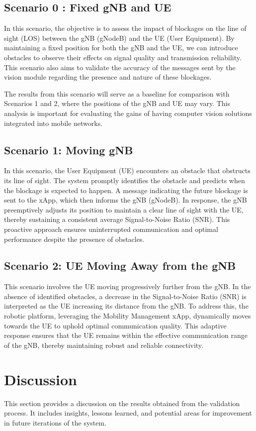\subsection{Scenario 0 : Fixed gNB and UE}

In this scenario, the objective is to assess the impact of blockages on the line of sight (LOS) between the gNB (gNodeB) and the UE (User Equipment).
By maintaining a fixed position for both the gNB and the UE, we can introduce obstacles to observe their effects on signal quality and transmission reliability.
This scenario also aims to validate the accuracy of the messages sent by the vision module regarding the presence and nature of these blockages.

The results from this scenario will serve as a baseline for comparison with Scenarios 1 and 2, where the positions of the gNB and UE may vary.
This analysis is important for evaluating the gains of having computer vision solutions integrated into mobile networks.

\subsection{Scenario 1: Moving gNB}
In this scenario, the User Equipment (UE) encounters an obstacle that obstructs its line of sight. %
The system promptly identifies the obstacle and predicts when the blockage is expected to happen.
A message indicating the future blockage is sent to the xApp, which then informs the gNB (gNodeB). In response, the gNB preemptively adjusts its position to maintain a clear line of sight with the UE, thereby sustaining a consistent average Signal-to-Noise Ratio (SNR). This proactive approach ensures uninterrupted communication and optimal performance despite the presence of obstacles.

\subsection{Scenario 2: UE Moving Away from the gNB}

This scenario involves the UE moving progressively further from the gNB. In the absence of identified obstacles, a decrease in the Signal-to-Noise Ratio (SNR) is interpreted as the UE increasing its distance from the gNB. To address this, the robotic platform, leveraging the Mobility Management xApp, dynamically moves towards the UE to uphold optimal communication quality.
This adaptive response ensures that the UE remains within the effective communication range of the gNB, thereby maintaining robust and reliable connectivity.


\section{Discussion}\label{sec:discuss}
This section provides a discussion on the results obtained from the validation process.
It includes insights, lessons learned, and potential areas for improvement in future iterations of the system.
